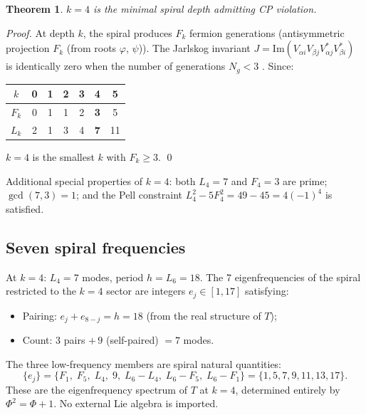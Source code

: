 \documentclass[12pt,a4paper]{article}
\newtheorem{theorem}{Theorem}[section]
\begin{document}
\begin{theorem}
$k = 4$ is the minimal spiral depth admitting CP violation.
\end{theorem}

\begin{proof}
At depth $k$, the spiral produces $F_k$ fermion generations (antisymmetric projection $F_k$ (from roots $\varphi$, $\psi$)). The Jarlskog invariant $J = \mathrm{Im}(V_{\alpha i} V_{\beta j} V^*_{\alpha j} V^*_{\beta i})$ is identically zero when the number of generations $N_g < 3$ \cite{PDG2024}. Since:
\begin{center}
\begin{tabular}{c|cccccc}
$k$ & 0 & 1 & 2 & 3 & \textbf{4} & 5 \\
\hline
$F_k$ & 0 & 1 & 1 & 2 & \textbf{3} & 5 \\
$L_k$ & 2 & 1 & 3 & 4 & \textbf{7} & 11
\end{tabular}
\end{center}
$k = 4$ is the smallest $k$ with $F_k \geq 3$. \qed
\end{proof}

\noindent Additional special properties of $k = 4$: both $L_4 = 7$ and $F_4 = 3$ are prime; $\gcd(7, 3) = 1$; and the Pell constraint $L_4^2 - 5F_4^2 = 49 - 45 = 4(-1)^4$ is satisfied.

\subsection{Seven spiral frequencies}

At $k = 4$: $L_4 = 7$ modes, period $h = L_6 = 18$. The 7 eigenfrequencies of the spiral restricted to the $k = 4$ sector are integers $e_j \in [1, 17]$ satisfying:
\begin{itemize}
\item Pairing: $e_j + e_{8-j} = h = 18$ (from the real structure of $T$);
\item Count: 3 pairs $+ \, 9$ (self-paired) $= 7$ modes.
\end{itemize}
The three low-frequency members are spiral natural quantities:
\begin{equation}
\boxed{\{e_j\} = \{F_1,\; F_5,\; L_4,\; 9,\; L_6{-}L_4,\; L_6{-}F_5,\; L_6{-}F_1\} = \{1, 5, 7, 9, 11, 13, 17\}.}
\end{equation}
These are the eigenfrequency spectrum of $T$ at $k = 4$, determined entirely by $\Phi^2 = \Phi + 1$. No external Lie algebra is imported.
\end{document}
